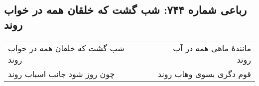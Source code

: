 \begin{center}
\section*{رباعی شماره ۷۴۴: شب گشت که خلقان همه در خواب روند}
\label{sec:0744}
\begin{longtable}{l p{0.5cm} r}
شب گشت که خلقان همه در خواب روند
&&
مانندهٔ ماهی همه در آب روند
\\
چون روز شود جانب اسباب روند
&&
قوم دگری بسوی وهاب روند
\\
\end{longtable}
\end{center}
